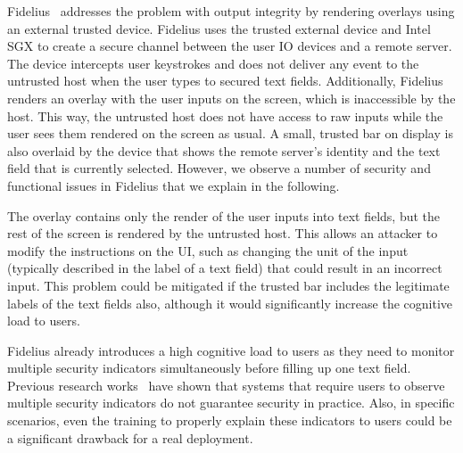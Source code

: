 Fidelius~\cite{Fidelius} addresses the problem with output integrity by rendering overlays using an external trusted device. Fidelius uses the trusted external device and Intel SGX to create a secure channel between the user IO devices and a remote server. The device intercepts user keystrokes and does not deliver any event to the untrusted host when the user types to secured text fields. Additionally, Fidelius renders an overlay with the user inputs on the screen, which is inaccessible by the host. This way, the untrusted host does not have access to raw inputs while the user sees them rendered on the screen as usual.
A small, trusted bar on display is also overlaid by the device that shows the remote server's identity and the text field that is currently selected. 
However, we observe a number of security and functional issues in Fidelius that we explain in the following.

The overlay contains only the render of the user inputs into text fields, but the rest of the screen is rendered by the untrusted host.
This allows an attacker to modify the instructions on the UI, such as changing the unit of the input (typically described in the label of a text field) that could result in an incorrect input. This problem could be mitigated if the trusted bar includes the legitimate labels of the text fields also, although it would significantly increase the cognitive load to users.

Fidelius already introduces a high cognitive load to users as they need to monitor multiple security indicators simultaneously before filling up one text field. Previous research works~\cite{egelman2008you,sobey2008exploring, anderson2016warning} have shown that systems that require users to observe multiple security indicators %
do not guarantee security in practice.
Also, in specific scenarios, even the training to properly explain these indicators to users could be a significant drawback for a real deployment.

